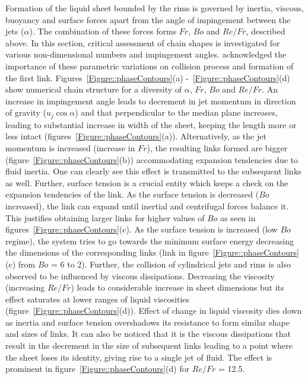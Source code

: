 \documentclass{jfm}
\begin{document}
Formation of the liquid sheet bounded by the rims is governed by inertia, viscous, buoyancy and surface forces apart from the angle of impingement between the jets ($\alpha$). The combination of these forces forms $Fr$, $Bo$ and $Re/Fr$, described above. In this section, critical assessment of chain shapes is investigated for various non-dimensional numbers and impingement angles. \cite{yang2014liquid} acknowledged the importance of these parametric variations on collision process and formation of the first link. Figures~\ref{Figure::phaseContours}(a) -~\ref{Figure::phaseContours}(d) show numerical chain structure for a diversity of $\alpha$, $Fr$, $Bo$ and $Re/Fr$. An increase in impingement angle leads to decrement in jet momentum in direction of gravity ($u_j\cos\alpha$) and that perpendicular to the median plane increases, leading to substantial increase in width of the sheet, keeping the length more or less intact (figures~\ref{Figure::phaseContours}(a)). Alternatively, as the jet momentum is increased (increase in $Fr$), the resulting links formed are bigger (figure~\ref{Figure::phaseContours}(b)) accommodating expansion tendencies due to fluid inertia. One can clearly see this effect is transmitted to the subsequent links as well. Further, surface tension is a crucial entity which keeps a check on the expansion tendencies of the link. As the surface tension is decreased ($Bo$ increased), the link can expand until inertial and centrifugal forces balance it. This justifies obtaining larger links for higher values of $Bo$ as seen in figures~\ref{Figure::phaseContours}(c). As the surface tension is increased (low $Bo$ regime), the system tries to go towards the minimum surface energy decreasing the dimensions of the corresponding links (link in figure~\ref{Figure::phaseContours}(c) from $Bo$ = 6 to 2). Further, the collision of cylindrical jets and rims is also observed to be influenced by viscous dissipations. Decreasing the viscosity (increasing $Re/Fr$) leads to considerable increase in sheet dimensions but its effect saturates at lower ranges of liquid viscosities (figure~\ref{Figure::phaseContours}(d)). Effect of change in liquid viscosity dies down as inertia and surface tension overshadows its resistance to form similar shape and sizes of links. It can also be noticed that it is the viscous dissipations that result in the decrement in the size of subsequent links leading to a point where the sheet loses its identity, giving rise to a single jet of fluid. The effect is prominent in figure~\ref{Figure::phaseContours}(d) for $Re/Fr$ = 12.5.\\
\end{document}
